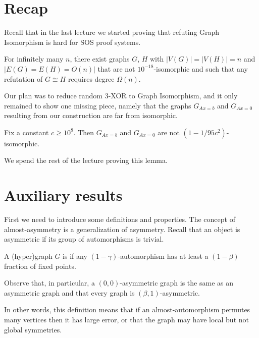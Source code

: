 \documentclass[a4paper,twoside,justified]{tufte-handout}
\newcommand{\PS}{\proofsystem{PC$_>$}}
\newcommand{\Glin}[1]{G_{Ax=#1}}
\begin{document}
 

\section{Recap}

Recall that in the last lecture we started proving that refuting Graph Isomorphism is hard for SOS proof systems.

\begin{theorem}\cite{o2014hardness}
  \label{th:gi-ps}
  For infinitely many $n$, there exist graphs $G$, $H$ with $|V(G)|=|V(H)|=n$ and $|E(G)=E(H)=O(n)|$ that are not $10^{-18}$-isomorphic and such that any \PS refutation of $G \cong H$ requires degree $\Omega(n)$.
\end{theorem}

Our plan was to reduce random 3-XOR to Graph Isomorphism, and it only remained to show one missing piece, namely that the graphs $\Glin{b}$ and $\Glin{0}$ resulting from our construction are far from isomorphic.

\begin{lemma}
  \label{lem:non-isomorphic}
  Fix a constant $c \geq 10^8$. Then \whp $\Glin{b}$ and $\Glin{0}$ are not $(1-1/95c^2)$-isomorphic.
\end{lemma}

We spend the rest of the lecture proving this lemma.

\section{Auxiliary results}

First we need to introduce some definitions and properties. The concept of almost-asymmetry is a generalization of asymmetry. Recall that an object is asymmetric if its group of automorphisms is trivial.

\begin{definition}
  \label{def:asymmetry} A (hyper)graph $G$ is  if any $(1-\gamma)$-automorphism has at least a $(1-\beta)$ fraction of fixed points.
\end{definition}

Observe that, in particular, a $(0,0)$-asymmetric graph is the same as an asymmetric graph and that every graph is $(\beta,1)$-asymmetric.

In other words, this definition means that if an almost-automorphism permutes many vertices then it has large error, or that the graph may have local but not global symmetries.
\end{document}
